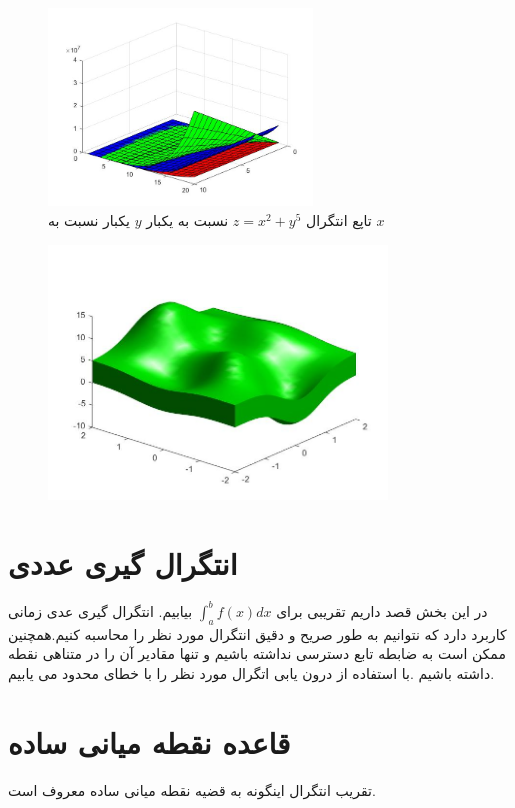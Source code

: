 \documentclass{article}
\begin{document}
\begin{figure}[!h]
    \centering
\includegraphics[width=7cm]{pic22codeIntegral.jpg}
    \caption{  تاپع انتگرال  $z=x^2+y^5$ نسبت به يکبار $y$ يکبار نسبت به $x$  }
    \label{fig:انتگرال خط}
\end{figure}

\begin{figure}[!h]
    \centering
\includegraphics[width=9cm]{pic45Integral.jpg}
    \caption{    }
    \label{fig:انتگرال خط}
\end{figure}


\pagebreak

\section{ انتگرال گیری عددی}
در این بخش قصد داریم تقریبی برای 
$\int_a^{b} f(x)dx$
بیابیم.
انتگرال گیری عدی زمانی کاربرد دارد که نتوانیم به طور صریح و دقیق انتگرال مورد نظر را محاسبه کنیم.همچنین ممکن است به ضابطه تابع دسترسی نداشته باشیم و تنها مقادیر آن را در متناهی نقطه داشته باشیم .با استفاده از درون یابی اتگرال مورد نظر را با خطای محدود می یابیم.
\citep{Numerical_solution}
\section{قاعده نقطه میانی ساده}
تقریب انتگرال اینگونه به قضیه نقطه میانی ساده معروف است.
\citep{Numerical_solution}
\end{document}
